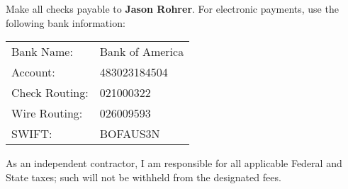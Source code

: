 \documentclass[12pt]{article}
\begin{document}
Make all checks payable to {\bf Jason Rohrer}.  For electronic payments, use the following bank information:

\begin{center}
\begin{tabular}{ll}
Bank Name: &Bank of America\\
Account: &483023184504\\
Check Routing: &021000322\\
Wire Routing: &026009593\\
SWIFT: &BOFAUS3N
\end{tabular}
\end{center}


As an independent contractor, I am responsible for all applicable Federal and State taxes;  such will not be withheld from the designated fees.
\end{document}
